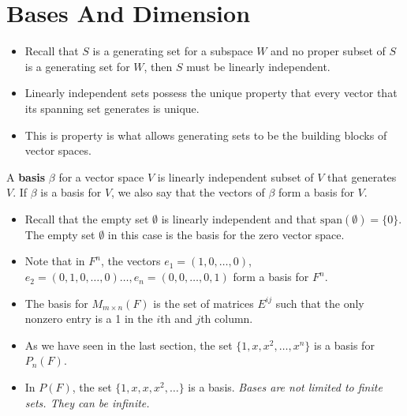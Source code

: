 \section{Bases And Dimension}

\begin{itemize}
    \item Recall that \( S  \) is a generating set for a subspace \( W  \) and no proper subset of \( S  \) is a generating set for \( W  \), then \( S  \) must be linearly independent. 
    \item Linearly independent sets possess the unique property that every vector that its spanning set generates is unique.
    \item This is property is what allows generating sets to be the building blocks of vector spaces.
\end{itemize}

\begin{definition}[Basis]
    A \textbf{basis} \( \beta \) for a vector space \( V  \) is linearly independent subset of \( V  \) that generates \( V  \). If \( \beta  \) is a basis for \( V  \), we also say that the vectors of \( \beta \) form a basis for \( V  \).
\end{definition}

\begin{eg}
    \begin{itemize}
        \item     Recall that the empty set \( \emptyset \) is linearly independent and that \( \text{span}(\emptyset) = \{ 0 \}  \). The empty set \( \emptyset \) in this case is the basis for the zero vector space.
        \item Note that in \( F^{n}  \), the vectors \( e_{1} = (1,0, \dots, 0 ) \), \( e_{2} = (0,1,0, \dots, 0 ) \dots, e_{n} = (0,0, \dots, 0, 1 ) \) form a basis for \( F^{n} \).
        \item The basis for \( M_{m \times n}(F ) \) is the set of matrices \( E^{ij} \) such that the only nonzero entry is a 1 in the \( i \)th and \( j \)th column.
        \item As we have seen in the last section, the set \( \{ 1, x , x^{2}, \dots, x^{n} \}  \) is a basis for \( P_{n}(F) \).
        \item In \( P(F) \), the set \( \{ 1,x ,x,  x^{2}, \dots \}  \) is a basis. \textit{Bases are not limited to finite sets. They can be infinite.} 
\end{itemize}
\end{eg}

